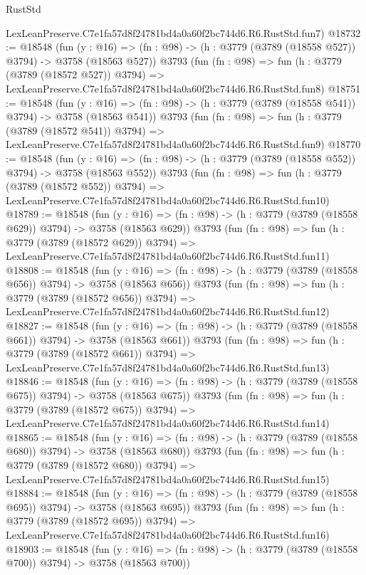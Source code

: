 \begin{lexlean}{RustStd}
\begin{coremodule}
    LexLeanPreserve.C7e1fa57d8f24781bd4a0a60f2bc744d6.R6.RustStd.fun7)
@18732 := @18548
    (fun (y : @16) => (fn : @98) -> (h : @3779 (@3789 (@18558 @527)) @3794) -> @3758 (@18563 @527))
    @3793
    (fun (fn : @98) =>
    fun (h : @3779 (@3789 (@18572 @527)) @3794) =>
    LexLeanPreserve.C7e1fa57d8f24781bd4a0a60f2bc744d6.R6.RustStd.fun8)
@18751 := @18548
    (fun (y : @16) => (fn : @98) -> (h : @3779 (@3789 (@18558 @541)) @3794) -> @3758 (@18563 @541))
    @3793
    (fun (fn : @98) =>
    fun (h : @3779 (@3789 (@18572 @541)) @3794) =>
    LexLeanPreserve.C7e1fa57d8f24781bd4a0a60f2bc744d6.R6.RustStd.fun9)
@18770 := @18548
    (fun (y : @16) => (fn : @98) -> (h : @3779 (@3789 (@18558 @552)) @3794) -> @3758 (@18563 @552))
    @3793
    (fun (fn : @98) =>
    fun (h : @3779 (@3789 (@18572 @552)) @3794) =>
    LexLeanPreserve.C7e1fa57d8f24781bd4a0a60f2bc744d6.R6.RustStd.fun10)
@18789 := @18548
    (fun (y : @16) => (fn : @98) -> (h : @3779 (@3789 (@18558 @629)) @3794) -> @3758 (@18563 @629))
    @3793
    (fun (fn : @98) =>
    fun (h : @3779 (@3789 (@18572 @629)) @3794) =>
    LexLeanPreserve.C7e1fa57d8f24781bd4a0a60f2bc744d6.R6.RustStd.fun11)
@18808 := @18548
    (fun (y : @16) => (fn : @98) -> (h : @3779 (@3789 (@18558 @656)) @3794) -> @3758 (@18563 @656))
    @3793
    (fun (fn : @98) =>
    fun (h : @3779 (@3789 (@18572 @656)) @3794) =>
    LexLeanPreserve.C7e1fa57d8f24781bd4a0a60f2bc744d6.R6.RustStd.fun12)
@18827 := @18548
    (fun (y : @16) => (fn : @98) -> (h : @3779 (@3789 (@18558 @661)) @3794) -> @3758 (@18563 @661))
    @3793
    (fun (fn : @98) =>
    fun (h : @3779 (@3789 (@18572 @661)) @3794) =>
    LexLeanPreserve.C7e1fa57d8f24781bd4a0a60f2bc744d6.R6.RustStd.fun13)
@18846 := @18548
    (fun (y : @16) => (fn : @98) -> (h : @3779 (@3789 (@18558 @675)) @3794) -> @3758 (@18563 @675))
    @3793
    (fun (fn : @98) =>
    fun (h : @3779 (@3789 (@18572 @675)) @3794) =>
    LexLeanPreserve.C7e1fa57d8f24781bd4a0a60f2bc744d6.R6.RustStd.fun14)
@18865 := @18548
    (fun (y : @16) => (fn : @98) -> (h : @3779 (@3789 (@18558 @680)) @3794) -> @3758 (@18563 @680))
    @3793
    (fun (fn : @98) =>
    fun (h : @3779 (@3789 (@18572 @680)) @3794) =>
    LexLeanPreserve.C7e1fa57d8f24781bd4a0a60f2bc744d6.R6.RustStd.fun15)
@18884 := @18548
    (fun (y : @16) => (fn : @98) -> (h : @3779 (@3789 (@18558 @695)) @3794) -> @3758 (@18563 @695))
    @3793
    (fun (fn : @98) =>
    fun (h : @3779 (@3789 (@18572 @695)) @3794) =>
    LexLeanPreserve.C7e1fa57d8f24781bd4a0a60f2bc744d6.R6.RustStd.fun16)
@18903 := @18548
    (fun (y : @16) => (fn : @98) -> (h : @3779 (@3789 (@18558 @700)) @3794) -> @3758 (@18563 @700))

\end{coremodule}
\end{lexlean}
